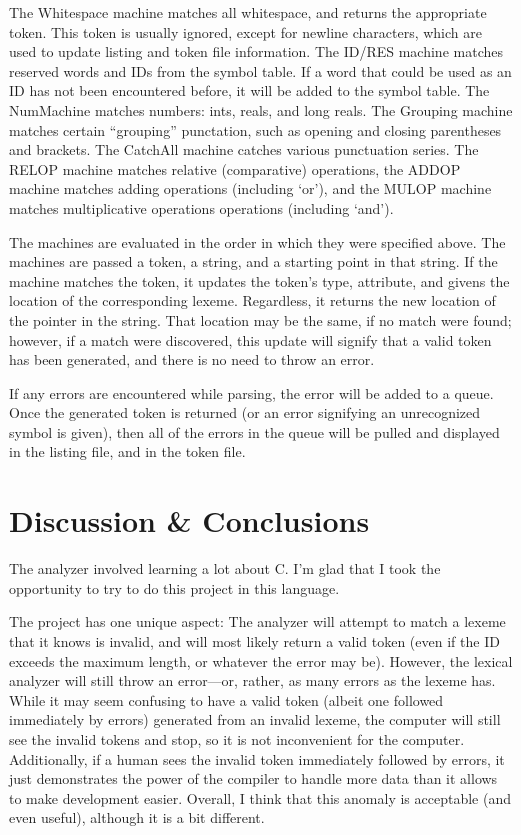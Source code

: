 \documentclass[titlepage]{article}
\begin{document}
    The Whitespace machine matches all whitespace, and returns the appropriate
    token. This token is usually ignored, except for newline characters, which
    are used to update listing and token file information. The ID/RES machine
    matches reserved words and IDs from the symbol table. If a word that could
    be used as an ID has not been encountered before, it will be added to the
    symbol table. The NumMachine matches numbers: ints, reals, and long reals.
    The Grouping machine matches certain ``grouping'' punctation, such as opening
    and closing parentheses and brackets. The CatchAll machine catches various
    punctuation series. The RELOP machine matches relative (comparative)
    operations, the ADDOP machine matches adding operations (including `or'),
    and the MULOP machine matches multiplicative operations operations
    (including `and').

    The machines are evaluated in the order in which they were specified above.
    The machines are passed a token, a string, and a starting point in that
    string. If the machine matches the token, it updates the token's type,
    attribute, and givens the location of the corresponding lexeme. Regardless,
    it returns the new location of the pointer in the string. That location
    may be the same, if no match were found; however, if a match were discovered,
    this update will signify that a valid token has been generated, and
    there is no need to throw an error.

    If any errors are encountered while parsing, the error will be added
    to a queue. Once the generated token is returned (or an error signifying an
    unrecognized symbol is given), then all of the errors in the queue will
    be pulled and displayed in the listing file, and in the token file.

    \section{Discussion \& Conclusions}
    The analyzer involved learning a lot about C. I'm glad that I took the
    opportunity to try to do this project in this language.

    The project has one unique aspect: The analyzer will attempt to match a
    lexeme that it knows is invalid, and will most likely return a valid token
    (even if the ID exceeds the maximum length, or whatever the error may be).
    However, the lexical analyzer will still throw an error---or, rather, as
    many errors as the lexeme has. While it may seem confusing to have a valid
    token (albeit one followed immediately by errors) generated from an invalid
    lexeme, the computer will still see the invalid tokens and stop, so it is
    not inconvenient for the computer. Additionally, if a human sees the invalid
    token immediately followed by errors, it just demonstrates the power of the
    compiler to handle more data than it allows to make development easier.
    Overall, I think that this anomaly is acceptable (and even useful), although
    it is a bit different.
\end{document}
